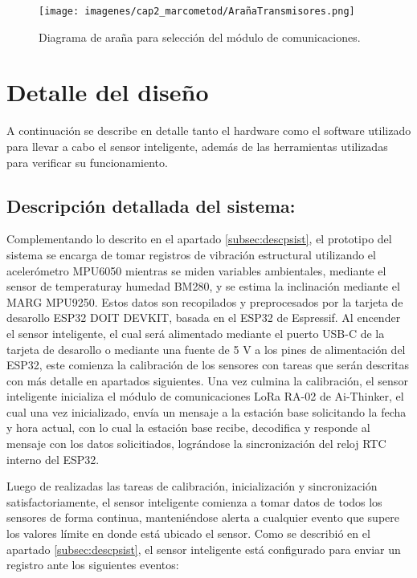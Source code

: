 \begin{figure}[H]
    \centering
    \texttt{[image: imagenes/cap2\_marcometod/ArañaTransmisores.png]}
    \caption{Diagrama de araña para selección del módulo de comunicaciones.}
    \label{fig:arañacomm}
\end{figure}


\section{Detalle del diseño} A continuación se describe en detalle tanto el hardware como el software utilizado para llevar a cabo el sensor inteligente, además de las herramientas utilizadas para verificar su funcionamiento.


\subsection{Descripción detallada del sistema:}
\label{subsec:descripcion}

Complementando lo descrito en el apartado \ref{subsec:descpsist}, el prototipo del sistema se encarga de tomar registros de vibración estructural utilizando el acelerómetro MPU6050 mientras se miden variables ambientales, mediante el sensor de temperaturay humedad BM280, y se estima la inclinación mediante el MARG MPU9250. Estos datos son recopilados y preprocesados por la tarjeta de desarollo ESP32 DOIT DEVKIT, basada en el ESP32 de Espressif. Al encender el sensor inteligente, el cual será alimentado mediante el puerto USB-C de la tarjeta de desarollo o mediante una fuente de 5 V a los pines de alimentación del ESP32, este comienza la calibración de los sensores con tareas que serán descritas con más detalle en apartados siguientes. Una vez culmina la calibración, el sensor inteligente inicializa el módulo de comunicaciones LoRa RA-02 de Ai-Thinker, el cual una vez inicializado, envía un mensaje a la estación base solicitando la fecha y hora actual, con lo cual la estación base recibe, decodifica y responde al mensaje con los datos solicitiados, lográndose la sincronización del reloj RTC interno del ESP32.

Luego de realizadas las tareas de calibración, inicialización y sincronización satisfactoriamente, el sensor inteligente comienza a tomar datos de todos los sensores de forma continua, manteniéndose alerta a cualquier evento que supere los valores límite en donde está ubicado el sensor. Como se describió en el apartado \ref{subsec:descpsist}, el sensor inteligente está configurado para enviar un registro ante los siguientes eventos:

